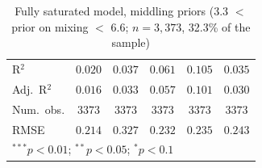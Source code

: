 \begin{table}
\begin{center}
\begin{tabular}{l c c || c c || c}
\hline
R$^2$                                  & $0.020$        & $0.037$        & $0.061$        & $0.105$        & $0.035$        \\
Adj.\ R$^2$                            & $0.016$        & $0.033$        & $0.057$        & $0.101$        & $0.030$        \\
Num.\ obs.                             & $3373$         & $3373$         & $3373$         & $3373$         & $3373$         \\
RMSE                                   & $0.214$        & $0.327$        & $0.232$        & $0.235$        & $0.243$        \\
\hline
\multicolumn{6}{l}{\scriptsize{$^{***}p<0.01$; $^{**}p<0.05$; $^{*}p<0.1$}}
\end{tabular}
\caption{Fully saturated model, middling priors (3.3 $<$ prior on mixing $<$ 6.6; $n = 3,373$, 32.3\% of the sample)}
\label{tab:saturated_med_priors}
\end{center}
\end{table}

